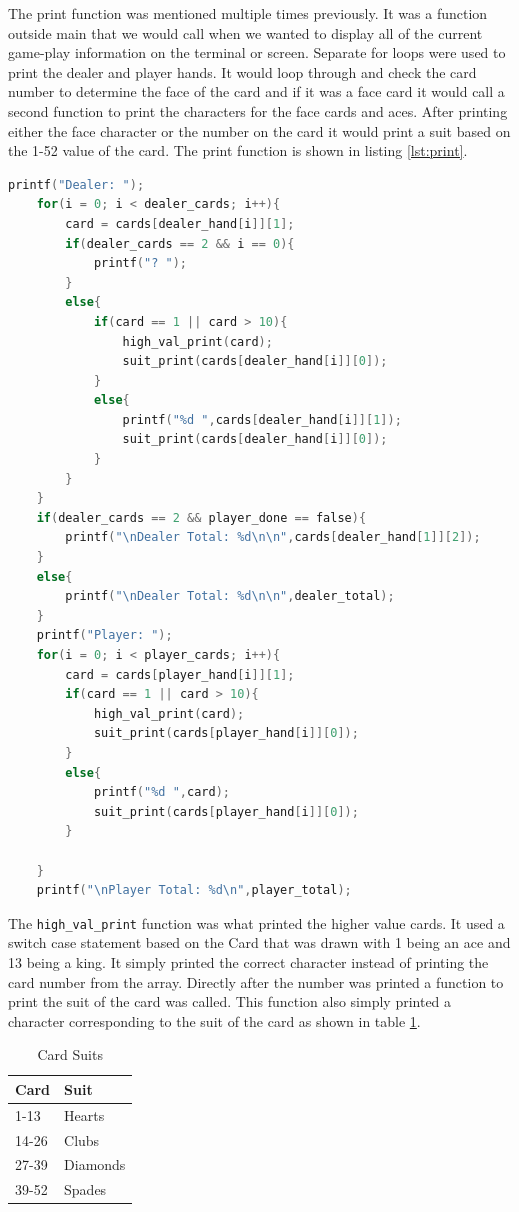 \documentclass[12pt]{article}
\begin{document}
The print function was mentioned multiple times previously. It was a function outside main that we would call when we wanted to display all of the current game-play information on the terminal or screen. Separate for loops were used to print the dealer and player hands. It would loop through and check the card number to determine the face of the card and if it was a face card it would call a second function to print the characters for the face cards and aces. After printing either the face character or the number on the card it would print a suit based on the 1-52 value of the card. The print function is shown in listing \ref{lst:print}.
\begin{lstlisting}[language = C, caption = Printing Function, label = {lst:print}]
printf("Dealer: ");
    for(i = 0; i < dealer_cards; i++){
        card = cards[dealer_hand[i]][1];
        if(dealer_cards == 2 && i == 0){
            printf("? ");
        }
        else{
            if(card == 1 || card > 10){
                high_val_print(card);
                suit_print(cards[dealer_hand[i]][0]);
            }
            else{
                printf("%d ",cards[dealer_hand[i]][1]);
                suit_print(cards[dealer_hand[i]][0]);
            }
        }  
    }
    if(dealer_cards == 2 && player_done == false){
        printf("\nDealer Total: %d\n\n",cards[dealer_hand[1]][2]);
    }
    else{
        printf("\nDealer Total: %d\n\n",dealer_total);
    }
    printf("Player: ");
    for(i = 0; i < player_cards; i++){
        card = cards[player_hand[i]][1];
        if(card == 1 || card > 10){
            high_val_print(card);
            suit_print(cards[player_hand[i]][0]);
        }
        else{
            printf("%d ",card);
            suit_print(cards[player_hand[i]][0]);
        }
        
    }
    printf("\nPlayer Total: %d\n",player_total);
\end{lstlisting}
The \texttt{high\_val\_print} function was what printed the higher value cards. It used a switch case statement based on the Card that was drawn with 1 being an ace and 13 being a king. It simply printed the correct character instead of printing the card number from the array. Directly after the number was printed a function to print the suit of the card was called. This function also simply printed a character corresponding to the suit of the card as shown in table \ref{tab:suit}.

\begin{table}[ht]
    \centering
    \begin{tabular}{|l|l|}
        \hline
        \textbf{Card} & \textbf{Suit} \\ \hline
        1-13 & Hearts \\ \hline
        14-26 & Clubs \\ \hline
        27-39 & Diamonds \\ \hline
        39-52 & Spades \\ \hline
    \end{tabular}
    \label{tab:suit}
    \caption{Card Suits}
\end{table}
\end{document}
